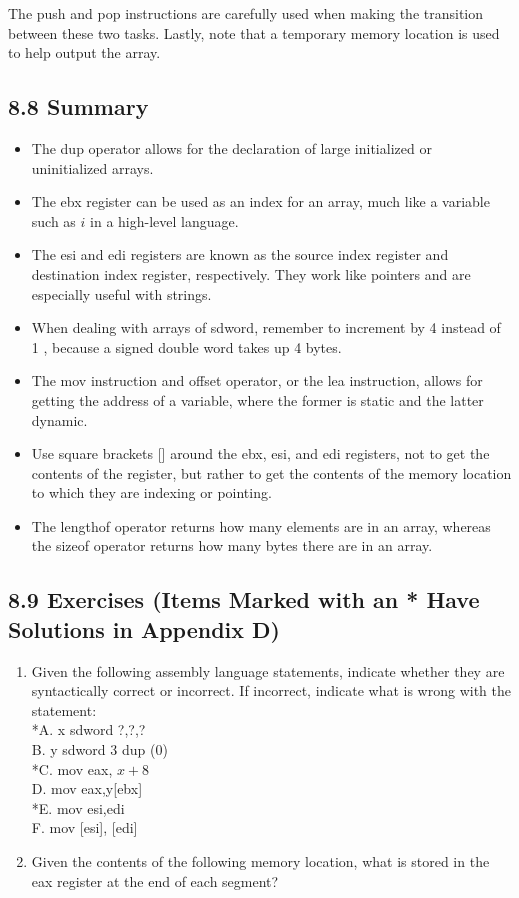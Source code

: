 \documentclass[10pt]{article}
\begin{document}
The push and pop instructions are carefully used when making the transition between these two tasks. Lastly, note that a temporary memory location is used to help output the array.

\subsection*{8.8 Summary}
\begin{itemize}
  \item The dup operator allows for the declaration of large initialized or uninitialized arrays.
  \item The ebx register can be used as an index for an array, much like a variable such as $i$ in a high-level language.
  \item The esi and edi registers are known as the source index register and destination index register, respectively. They work like pointers and are especially useful with strings.
  \item When dealing with arrays of sdword, remember to increment by 4 instead of 1 , because a signed double word takes up 4 bytes.
  \item The mov instruction and offset operator, or the lea instruction, allows for getting the address of a variable, where the former is static and the latter dynamic.
  \item Use square brackets [] around the ebx, esi, and edi registers, not to get the contents of the register, but rather to get the contents of the memory location to which they are indexing or pointing.
  \item The lengthof operator returns how many elements are in an array, whereas the sizeof operator returns how many bytes there are in an array.
\end{itemize}

\subsection*{8.9 Exercises (Items Marked with an * Have Solutions in Appendix D)}
\begin{enumerate}
  \item Given the following assembly language statements, indicate whether they are syntactically correct or incorrect. If incorrect, indicate what is wrong with the statement:\\
*A. x sdword ?,?,?\\
B. y sdword 3 dup (0)\\
*C. mov eax, $x+8$\\[0pt]
D. mov eax,y[ebx]\\
*E. mov esi,edi\\[0pt]
F. mov [esi], [edi]
  \item Given the contents of the following memory location, what is stored in the eax register at the end of each segment?
\end{enumerate}
\end{document}
